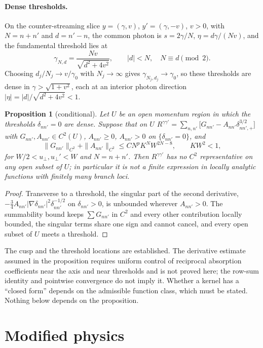 \documentclass[11pt,a4paper]{article}
\numberwithin{equation}{section}
\newtheorem{proposition}{Proposition}[section]
\newcommand{\uperp}{u_\perp}
\begin{document}
\paragraph{Dense thresholds.} On the counter-streaming slice $y=(\gamma,v)$,
$y'=(\gamma,-v)$, $v>0$, with $N=n+n'$ and $d=n'-n$, the common photon is
$s=2\gamma/N$, $\eta=d\gamma/(Nv)$, and the fundamental threshold lies at
\begin{equation}
\gamma_{N,d}=\frac{Nv}{\sqrt{d^2+4v^2}},\qquad |d|<N,\quad N\equiv d\pmod2 .
\end{equation}
Choosing $d_j/N_j\to v/\gamma_0$ with $N_j\to\infty$ gives $\gamma_{N_j,d_j}\to\gamma_0$,
so these thresholds are dense in $\gamma>\sqrt{1+v^2}$, each at an interior
photon direction $|\eta|=|d|/\sqrt{d^2+4v^2}<1$.

\begin{proposition}[conditional]
Let $U$ be an open momentum region in which the thresholds $\delta_{nn'}=0$
are dense. Suppose that on $U$
$R^{\gamma\gamma'}=\sum_{n,n'}\bigl[G_{nn'}-A_{nn'}\delta_{nn',+}^{3/2}\bigr]$ with
$G_{nn'},A_{nn'}\in C^2(U)$, $A_{nn'}\ge0$, $A_{nn'}>0$ on $\{\delta_{nn'}=0\}$, and
\[
\|G_{nn'}\|_{C^2}+\|A_{nn'}\|_{C^2}\le CN^pK^NW^{2N-8},\qquad KW^2<1,
\]
for $W/2<\uperp,\uperp'<W$ and $N=n+n'$. Then $R^{\gamma\gamma'}$ has no $C^2$
representative on any open subset of $U$; in particular it is not a finite
expression in locally analytic functions with finitely many branch loci.
\end{proposition}
\begin{proof}
Transverse to a threshold, the singular part of the second derivative,
$-\tfrac34A_{nn'}|\nabla\delta_{nn'}|^2\delta_{nn'}^{-1/2}$ on $\delta_{nn'}>0$, is
unbounded wherever $A_{nn'}>0$. The summability bound keeps $\sum G_{nn'}$ in
$C^2$ and every other contribution locally bounded, the singular terms share
one sign and cannot cancel, and every open subset of $U$ meets a threshold.
\end{proof}
The cusp and the threshold locations are established. The derivative estimate
assumed in the proposition requires uniform control of reciprocal absorption
coefficients near the axis and near thresholds and is not proved here; the
row-sum identity and pointwise convergence do not imply it. Whether a kernel
has a ``closed form'' depends on the admissible function class, which must be
stated. Nothing below depends on the proposition.

\section{Modified physics}\label{sec:modified}
\end{document}
